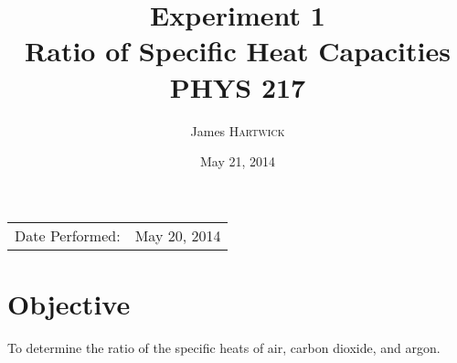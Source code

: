 \documentclass{article}
\title{Experiment 1 \\ Ratio of Specific Heat Capacities \\ PHYS 217} %
\author{James \textsc{Hartwick}} %
\date{May 21, 2014} %
\begin{document}
\maketitle %

\begin{center}
\begin{tabular}{l r}
Date Performed: & May 20, 2014 \\ %
\end{tabular}
\end{center}



\section{Objective}

To determine the ratio of the specific heats of air, carbon dioxide, and argon. 



 
\end{document}
